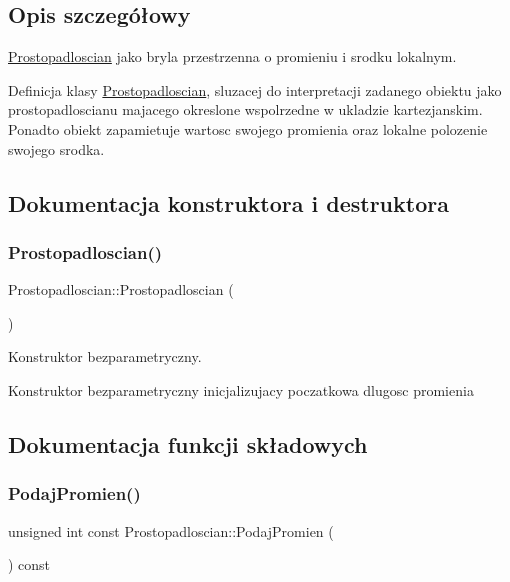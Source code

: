 \subsection{Opis szczegółowy}
\hyperlink{classProstopadloscian}{Prostopadloscian} jako bryla przestrzenna o promieniu i srodku lokalnym. 

Definicja klasy \hyperlink{classProstopadloscian}{Prostopadloscian}, sluzacej do interpretacji zadanego obiektu jako prostopadloscianu majacego okreslone wspolrzedne w ukladzie kartezjanskim. Ponadto obiekt zapamietuje wartosc swojego promienia oraz lokalne polozenie swojego srodka. 

\subsection{Dokumentacja konstruktora i destruktora}
\mbox{\label{classProstopadloscian_a432b8df2af37ba1a3596f500824eaffe}} 
\subsubsection{\texorpdfstring{Prostopadloscian()}{Prostopadloscian()}}
{\footnotesize\ttfamily Prostopadloscian\+::\+Prostopadloscian (\begin{DoxyParamCaption}{ }\end{DoxyParamCaption})\hspace{0.3cm}{\ttfamily [inline]}}



Konstruktor bezparametryczny. 

Konstruktor bezparametryczny inicjalizujacy poczatkowa dlugosc promienia 

\subsection{Dokumentacja funkcji składowych}
\mbox{\label{classProstopadloscian_ae6b1528649b6034209ac763cc5881527}} 
\subsubsection{\texorpdfstring{Podaj\+Promien()}{PodajPromien()}}
{\footnotesize\ttfamily unsigned int const Prostopadloscian\+::\+Podaj\+Promien (\begin{DoxyParamCaption}{ }\end{DoxyParamCaption}) const\hspace{0.3cm}{\ttfamily [inline]}}



